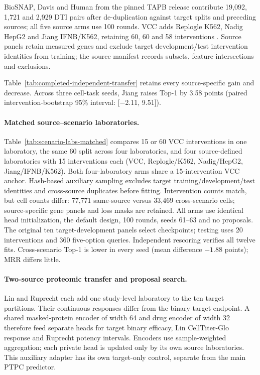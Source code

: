 

BioSNAP, Davis and Human from the pinned TAPB release contribute 19,092, 1,721 and 2,929 DTI pairs after de-duplication against target splits and preceding sources; all five source arms use 100 rounds. VCC adds Replogle K562, Nadig HepG2 and Jiang IFNB/K562, retaining 60, 60 and 58 interventions \citep{replogle2022perturbseq,nadig2025trade,jiang2025pathways}. Source panels retain measured genes and exclude target development/test intervention identities from training; the source manifest records subsets, feature intersections and exclusions.



Table~\ref{tab:completed-independent-transfer} retains every source-specific gain and decrease. Across three cell-task seeds, Jiang raises Top-1 by 3.58 points (paired intervention-bootstrap 95\% interval: [$-$2.11, 9.51]).

\paragraph{Matched source--scenario laboratories.}
Table~\ref{tab:scenario-labs-matched} compares 15 or 60 VCC interventions in one laboratory, the same 60 split across four laboratories, and four source-defined laboratories with 15 interventions each (VCC, Replogle/K562, Nadig/HepG2, Jiang/IFNB/K562). Both four-laboratory arms share a 15-intervention VCC anchor. Hash-based auxiliary sampling excludes target training/development/test identities and cross-source duplicates before fitting. Intervention counts match, but cell counts differ: 77,771 same-source versus 33,469 cross-scenario cells; source-specific gene panels and loss masks are retained. All arms use identical head initialization, the default design, 100 rounds, seeds 61--63 and no proposals. The original ten target-development panels select checkpoints; testing uses 20 interventions and 360 five-option queries. Independent rescoring verifies all twelve fits. Cross-scenario Top-1 is lower in every seed (mean difference $-1.88$ points); MRR differs little.



\paragraph{Two-source proteomic transfer and proposal search.}
Lin \citep{Lin2026HDAC} and Ruprecht \citep{Ruprecht2020Proteome} each add one study-level laboratory to the ten target partitions. Their continuous responses differ from the binary target endpoint. A shared masked-protein encoder of width 64 and drug encoder of width 32 therefore feed separate heads for target binary efficacy, Lin CellTiter-Glo response and Ruprecht potency intervals. Encoders use sample-weighted aggregation; each private head is updated only by its own source laboratories. This auxiliary adapter has its own target-only control, separate from the main PTPC predictor.

